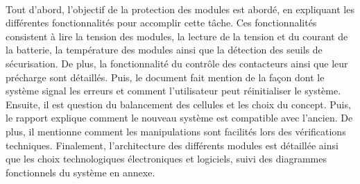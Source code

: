 		\paragraph*{}
		Tout d'abord, l'objectif de la protection des modules est abordé, en expliquant les différentes fonctionnalités pour accomplir cette tâche. Ces fonctionnalités consistent à lire la tension des modules, la lecture de la tension et du courant de la batterie, la température des modules ainsi que la détection des seuils de sécurisation. De plus, la fonctionnalité du contrôle des contacteurs ainsi que leur précharge sont détaillés. Puis, le document fait mention de la façon dont le système signal les erreurs et comment l'utilisateur peut réinitialiser le système.	Ensuite, il est question du balancement des cellules et les choix du concept. Puis, le rapport explique comment le nouveau système est compatible avec l'ancien. De plus, il mentionne comment les manipulations sont facilités lors des vérifications techniques. Finalement, l'architecture des différents modules est détaillée ainsi que les choix technologiques électroniques et logiciels, suivi des diagrammes fonctionnels du système en annexe.
	
			
